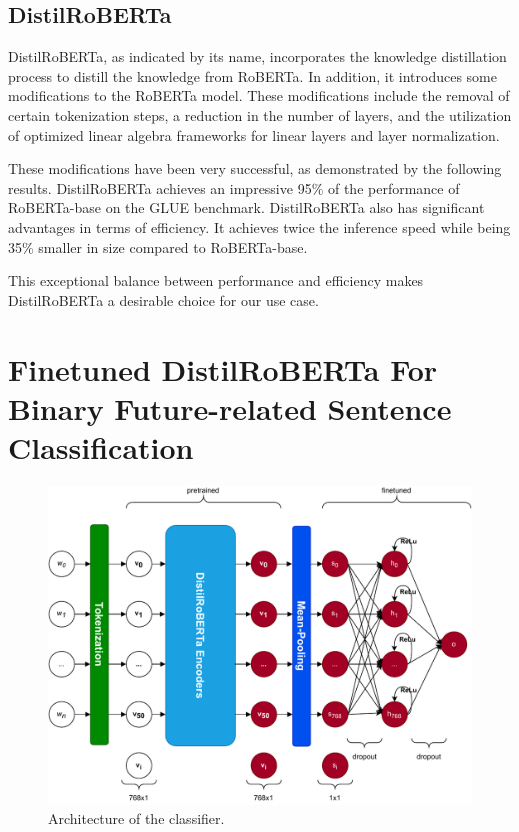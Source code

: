 \documentclass[12pt,oneside,bibtotoc,liststotoc]{scrbook}
\begin{document}
\subsection{DistilRoBERTa}
DistilRoBERTa, as indicated by its name, incorporates the knowledge distillation process to distill the knowledge from RoBERTa. In addition, it introduces some modifications to the RoBERTa model. These modifications include the removal of certain tokenization steps, a reduction in the number of layers, and the utilization of optimized linear algebra frameworks for linear layers and layer normalization.

These modifications have been very successful, as demonstrated by the following results. DistilRoBERTa achieves an impressive 95\% of the performance of RoBERTa-base on the GLUE benchmark. DistilRoBERTa also has significant advantages in terms of efficiency. It achieves twice the inference speed while being 35\% smaller in size compared to RoBERTa-base.

This exceptional balance between performance and efficiency makes DistilRoBERTa a desirable choice for our use case. \cite{distilbert}

\section{Finetuned DistilRoBERTa For Binary Future-related Sentence Classification}
\begin{figure}
  \centering
  \includegraphics[width=15cm]{img/classifier_archi.pdf}
  \caption{Architecture of the classifier.}
  \label{fig:classifier_archi}
\end{figure}
\end{document}
